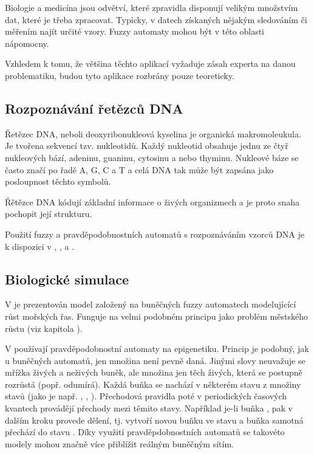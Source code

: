 \documentclass[a4paper,10pt]{article}
\begin{document}
Biologie a medicína jsou odvětví, které zpravidla disponují velikým množstvím dat, které je třeba zpracovat. Typicky, v datech získaných nějakým sledováním či měřením najít určité vzory. Fuzzy automaty mohou být v této oblasti nápomocny.

Vzhledem k tomu, že většina těchto aplikací vyžaduje zásah experta na danou problematiku, budou tyto aplikace rozbrány pouze teoreticky.


\subsection{Rozpoznávání řetězců DNA}
Řetězec DNA, neboli deoxyribonukleová kyselina je organická makromoleukula. Je tvořena sekvencí tzv. nukleotidů. Každý nukleotid obsahuje jednu ze čtyř nukleových bází, adeninu, guaninu, cytosinu a nebo thyminu. Nukleové báze se často značí po řadě A, G, C a T a celá DNA tak může být zapsána jako posloupnost těchto symbolů.

Řětězce DNA kódují základní informace o živých organizmech a je proto snaha pochopit její strukturu. 

Použití fuzzy a pravděpodobnostních automatů s rozpoznáváním vzorců DNA je k dispozici v \cite{SnaKepAbrHas-AproxStriMatchFuzzAut}, \cite{Ron-AutLeaApp}, \cite{ZlaSteSch-FiStaConTraFemPro} a \cite{Her-ProAriAutAppSoComFraBioSeqAna}.



\subsection{Biologické simulace}
V \cite{CheMyn-ModAlgBloDutCosWat+} je prezentován model založený na buněčných fuzzy automatech modelujícící růst mořských řas. Funguje na velmi podobném principu jako problém městského růstu (viz kapitola ).

V \cite{MilAtl-ProAuModEpiCelNet} používají pravděpodobnostní automaty na epigenetiku. Princip je podobný, jak u buněčných automatů, jen množina  není pevně daná. Jinými slovy neuvažuje se mřížka živých a neživých buněk, ale množina jen těch živých, která se postupně rozrůstá (popř. odumírá). Každá buňka se nachází v některém stavu z množiny stavů (jako je např. , , ). Přechodová pravidla poté v periodických časových kvantech provádějí přechody mezi těmito stavy. Například je-li buňka , pak v dalším kroku provede dělení, tj. vytvoří novou buňku ve stavu  a buňka samotná přechází do stavu . Díky využití pravděpdobnostních automatů se takovéto modely mohou značně více přiblížit reálným buněčným sítím.
\end{document}
